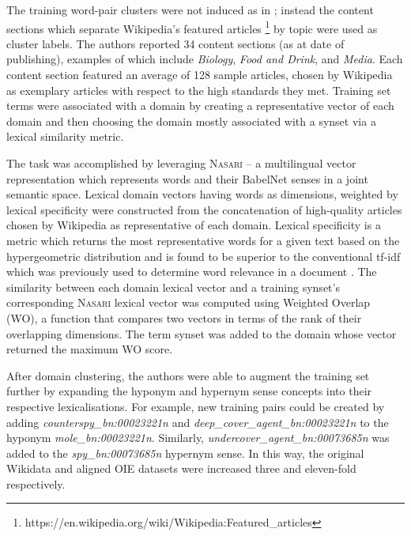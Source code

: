The training word-pair clusters were not induced as in \citep{Fu2014, ustalov2017negative}; instead the content sections which separate Wikipedia’s featured articles \footnote{https://en.wikipedia.org/wiki/Wikipedia:Featured\_articles} by topic were used as cluster labels.  The authors reported 34 content sections (as at date of publishing), examples of which include \textit{Biology}, \textit{Food and Drink}, and \textit{Media}.  Each content section featured an average of 128 sample articles, chosen by Wikipedia as exemplary articles with respect to the high standards they met.  Training set terms were associated with a domain by creating a representative vector of each domain and then choosing the domain mostly associated with a synset via a lexical similarity metric.

The task was accomplished by leveraging \textsc{Nasari} \citep{camacho2016nasari} – a multilingual vector representation which represents words and their BabelNet senses in a joint semantic space.  Lexical domain vectors having words as dimensions, weighted by lexical specificity \citep{camacho2016nasari} were constructed from the concatenation of high-quality articles chosen by Wikipedia as representative of each domain.  Lexical specificity is a metric which returns the most representative words for a given text based on the hypergeometric distribution and is found to be superior to the conventional \ac{tf-idf} which was previously used to determine word relevance in a document \citep{camacho2016nasari}.  The similarity between each domain lexical vector and a training synset’s corresponding \textsc{Nasari} lexical vector was computed using Weighted Overlap (WO), a function that compares two vectors in terms of the rank of their overlapping dimensions.  The term synset was added to the domain whose vector returned the maximum WO score.

After domain clustering, the authors were able to augment the training set further by expanding the hyponym and hypernym sense concepts into their respective lexicalisations.  For example, new training pairs could be created by adding  \textit{counterspy\_bn:00023221n} and \textit{deep\_cover\_agent\_bn:00023221n} to the hyponym \textit{mole\_bn:00023221n}.  Similarly,  \textit{undercover\_agent\_bn:00073685n} was added to the  \textit{spy\_bn:00073685n} hypernym sense.  In this way, the original Wikidata and aligned OIE datasets were increased three and eleven-fold respectively.  

